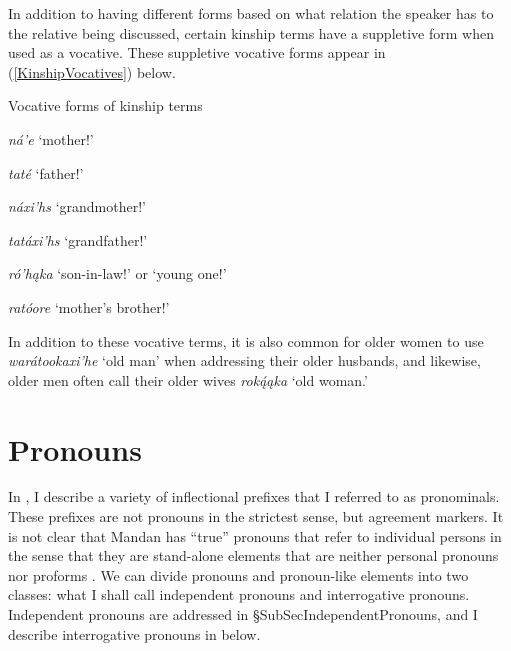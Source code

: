 In addition to having different forms based on what relation the speaker has to the relative being discussed, certain kinship terms have a suppletive form when used as a vocative. These suppletive vocative forms appear in (\ref{KinshipVocatives}) below.

\begin{exe}

\item\label{KinshipVocatives} Vocative forms of kinship terms

    \begin{xlist}
    
    \item\label{KinshipVocatives1} \textit{ná'e} `mother!'
    
    \item\label{KinshipVocatives2} \textit{taté} `father!' 
    
    \item\label{KinshipVocatives3} \textit{náxi'hs} `grandmother!'
    
    \item\label{KinshipVocatives4} \textit{tatáxi'hs} `grandfather!'
    
    \item\label{KinshipVocatives5} \textit{ró'hąka} `son-in-law!' or `young one!'
    
    \item\label{KinshipVocative6} \textit{ratóore} `mother's brother!'
    \end{xlist}

\end{exe}

In addition to these vocative terms, it is also common for older women to use \textit{warátookaxi'he} `old man' when addressing their older husbands, and likewise, older men often call their older wives \textit{roką́ąka} `old woman.'

\section{Pronouns}\label{SecPronouns}

In , I describe
a variety of inflectional prefixes that I referred to as pronominals. These prefixes are not pronouns in the strictest sense, but agreement markers. It is not clear that Mandan has ``true'' pronouns that refer to individual persons in the sense that they are stand-alone elements that are neither personal pronouns nor proforms \citet{bhat2004}. We can divide pronouns and pronoun-like elements into two classes: what I shall call independent pronouns and interrogative pronouns. Independent pronouns are addressed in \S{SubSecIndependentPronouns}, and I describe interrogative pronouns in  below.


